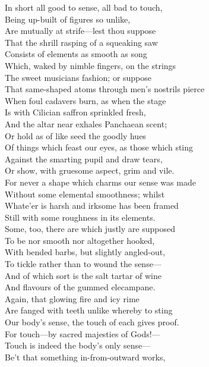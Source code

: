 In short all good to sense, all bad to touch,\\
Being up-built of figures so unlike,\\
Are mutually at strife—lest thou suppose\\
That the shrill rasping of a squeaking saw\\
Consists of elements as smooth as song\\
Which, waked by nimble fingers, on the strings\\
The sweet musicians fashion; or suppose\\
That same-shaped atoms through men's nostrils pierce\\
When foul cadavers burn, as when the stage\\
Is with Cilician saffron sprinkled fresh,\\
And the altar near exhales Panchaean scent;\\
Or hold as of like seed the goodly hues\\
Of things which feast our eyes, as those which sting\\
Against the smarting pupil and draw tears,\\
Or show, with gruesome aspect, grim and vile.\\
For never a shape which charms our sense was made\\
Without some elemental smoothness; whilst\\
Whate'er is harsh and irksome has been framed\\
Still with some roughness in its elements.\\
Some, too, there are which justly are supposed\\
To be nor smooth nor altogether hooked,\\
With bended barbs, but slightly angled-out,\\
To tickle rather than to wound the sense—\\
And of which sort is the salt tartar of wine\\
And flavours of the gummed elecampane.\\
Again, that glowing fire and icy rime\\
Are fanged with teeth unlike whereby to sting\\
Our body's sense, the touch of each gives proof.\\
For touch—by sacred majesties of Gods!—\\
Touch is indeed the body's only sense—\\
Be't that something in-from-outward works,\\
